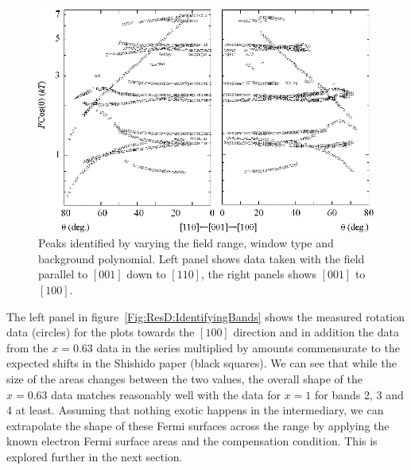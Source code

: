 \begin{figure}[htbp]
    \begin{center}
        \includegraphics[scale=0.9]{Chapter-dHvABaFe2P2/Figures/AngleDepMeasurements/AngleSweepMeasured/AngleSweepMeasured}
        \caption{Peaks identified by varying the field range, window type and background polynomial. Left panel shows data taken with the field parallel to $[001]$ down to $[110]$, the right panels shows $[001]$ to $[100]$.}
        \label{Fig:ResD:AngleSweepMeasured}
    \end{center}
\end{figure}

The left panel in figure~\ref{Fig:ResD:IdentifyingBands} shows the measured rotation data (circles) for the plots towards the $[100]$ direction and in addition the data from the $x=0.63$ data in the \BaFePAs series multiplied by amounts commensurate to the expected shifts in the Shishido paper\cite{Shishido2010} (black squares). We can see that while the size of the areas changes between the two values, the overall shape of the $x=0.63$ data matches reasonably well with the data for $x=1$ for bands 2, 3 and 4 at least. Assuming that nothing exotic happens in the intermediary, we can extrapolate the shape of these Fermi surfaces across the range by applying the known electron Fermi surface areas and the compensation condition. This is explored further in the next section.

